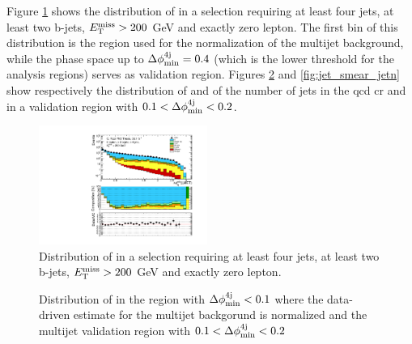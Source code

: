 Figure \ref{fig:jet_smear_dphi} shows the distribution of \dphimin in a selection requiring at least four jets, at least two b-jets, $E_{\rm T}^{\mathrm{miss}}>200$ GeV and exactly zero lepton. The first bin of this distribution is the region used for the normalization of the multijet background, 
while the phase space up to $\Delta\phi_{\rm{min}}^{4{\rm{j}}}=0.4$ (which is the lower threshold for the analysis regions) serves as validation region. 
Figures \ref{fig:jet_smear_met} and \ref{fig:jet_smear_jetn} show respectively the distribution of \met and of the number of jets in the \gls{qcd} \gls{cr} and in a validation region with $0.1 < \Delta\phi_{\rm{min}}^{4{\rm{j}}} < 0.2$.

\begin{figure}[h!]
\centering 
\includegraphics[width=0.49\textwidth]{figures/susy_common/jet_smearing/data_mc_dphi_min_QCD_noDphi.pdf}
\caption{Distribution of \dphimin in a selection requiring at least four jets, at least two b-jets, $E_{\rm T}^{\mathrm{miss}}>200$ GeV and exactly zero lepton.}\label{fig:jet_smear_dphi}
\end{figure}


\begin{figure}[h!]
\centering 
{}
\caption{Distribution of \met in  the region with $\Delta\phi_{\rm{min}}^{4{\rm{j}}} < 0.1$ where the data-driven estimate for the multijet backgorund is normalized and  the multijet validation region with $0.1 < \Delta\phi_{\rm{min}}^{4{\rm{j}}} < 0.2$}\label{fig:jet_smear_met}
\end{figure}

